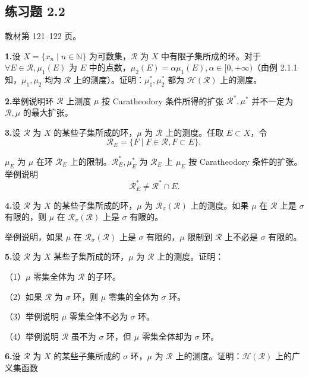 \documentclass[11pt,a4paper]{article}
\begin{document}
\subsection*{练习题 2.2}
\noindent 教材第 121--122 页。
\par{}\noindent\textbf{1.}\quad 设 $X=\{x_n\mid n\in\mathbb N\}$ 为可数集，$\mathcal R$ 为 $X$ 中有限子集所成的环。对于 $\forall E\in\mathcal R,\mu_1(E)$ 为 $E$ 中的点数，$\mu_2(E)=\alpha\mu_1(E),\alpha\in[0,+\infty)$（由例 2.1.1 知，$\mu_1,\mu_2$ 均为 $\mathcal R$ 上的测度）。证明：$\mu_1^*,\mu_2^*$ 都为 $\mathcal H(\mathcal R)$ 上的测度。
\par{}\noindent\textbf{2.}\quad 举例说明环 $\mathcal R$ 上测度 $\mu$ 按 Caratheodory 条件所得的扩张 $\mathcal R^*,\mu^*$ 并不一定为 $\mathcal R,\mu$ 的最大扩张。
\par{}\noindent\textbf{3.}\quad 设 $\mathcal R$ 为 $X$ 的某些子集所成的环，$\mu$ 为 $\mathcal R$ 上的测度。任取 $E\subset X$，令
\[\mathcal R_E=\{F\mid F\in\mathcal R,F\subset E\},\]
\par\noindent $\mu_E$ 为 $\mu$ 在环 $\mathcal R_E$ 上的限制。$\mathcal R_E^*,\mu_E^*$ 为 $\mathcal R_E$ 上 $\mu_E$ 按 Caratheodory 条件的扩张。举例说明
\[\mathcal R_E^*\ne\mathcal R^*\cap E.\]
\par{}\noindent\textbf{4.}\quad 设 $\mathcal R$ 为 $X$ 的某些子集所成的环，$\mu$ 为 $\mathcal R_\sigma(\mathcal R)$ 上的测度。如果 $\mu$ 在 $\mathcal R$ 上是 $\sigma$ 有限的，则 $\mu$ 在 $\mathcal R_\sigma(\mathcal R)$ 上是 $\sigma$ 有限的。
\par\noindent 举例说明，如果 $\mu$ 在 $\mathcal R_\sigma(\mathcal R)$ 上是 $\sigma$ 有限的，$\mu$ 限制到 $\mathcal R$ 上不必是 $\sigma$ 有限的。
\par{}\noindent\textbf{5.}\quad 设 $\mathcal R$ 为 $X$ 某些子集所成的环，$\mu$ 为 $\mathcal R$ 上的测度。证明：
\par\noindent （1）$\mu$ 零集全体为 $\mathcal R$ 的子环。
\par\noindent （2）如果 $\mathcal R$ 为 $\sigma$ 环，则 $\mu$ 零集的全体为 $\sigma$ 环。
\par\noindent （3）举例说明 $\mu$ 零集全体不必为 $\sigma$ 环。
\par\noindent （4）举例说明 $\mathcal R$ 虽不为 $\sigma$ 环，但 $\mu$ 零集全体却为 $\sigma$ 环。
\par{}\noindent\textbf{6.}\quad 设 $\mathcal R$ 为 $X$ 的某些子集所成的 $\sigma$ 环，$\mu$ 为 $\mathcal R$ 上的测度。证明：$\mathcal H(\mathcal R)$ 上的广义集函数
\end{document}
